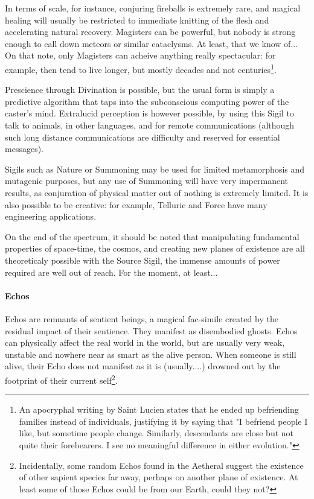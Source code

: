 In terms of scale, for instance, conjuring fireballs is extremely rare, and magical healing will usually be restricted to immediate knitting of the flesh and accelerating natural recovery. Magisters can be powerful, but nobody is strong enough to call down meteors or similar cataclysms. At least, that we know of... On that note, only Magisters can acheive anything really spectacular: for example, then tend to live longer, but mostly decades and not centuries\footnote{An apocryphal writing by Saint Lucien states that he ended up befriending families instead of individuals, justifying it by saying that "I befriend people I like, but sometime people change. Similarly, descendants are close but not quite their forebearers. I see no meaningful difference in either evolution."}.

Prescience through Divination is possible, but the usual form is simply a predictive algorithm that taps into the subconscious computing power of the caster's mind. Extralucid perception is however possible, by using this Sigil to talk to animals, in other languages, and for remote communications (although such long distance communications are difficulty and reserved for essential messages).

Sigils such as Nature or Summoning may be used for limited metamorphosis and mutagenic purposes, but any use of Summoning will have very impermanent results, as conjuration of physical matter out of nothing is extremely limited. It is also possible to be creative: for example, Telluric and Force have many engineering applications.

On the end of the spectrum, it should be noted that manipulating fundamental properties of space-time, the cosmos, and creating new planes of existence are all theoreticaly possible with the Source Sigil, the immense amounts of power required are well out of reach. For the moment, at least...

\paragraph{Echos}

Echos are remnants of sentient beings, a magical fac-simile created by the residual impact of their sentience. They manifest as disembodied ghosts. Echos can physically affect the real world in the world, but are usually very weak, unstable and nowhere near as smart as the alive person. When someone is still alive, their Echo does not manifest as it is (usually....) drowned out by the footprint of their current self\footnote{Incidentally, some random Echos found in the Aetheral suggest the existence of other sapient species far away, perhaps on another plane of existence. At least some of those Echos could be from our Earth, could they not?}.

